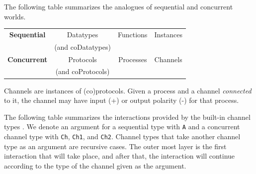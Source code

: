 \documentclass[acmsmall]{acmart}
\begin{document}
The following table summarizes the analogues of sequential and concurrent worlds.

\begin{center}
\begin{tabular}{ c | c | c | c }
 {\bf Sequential} & Datatypes  & Functions & Instances \\ 
   & (and coDatatypes)  &  &  \\
 \hline
 {\bf Concurrent} & Protocols & Processes & Channels \\  
 & (and coProtocols)  &  &  \\
\end{tabular}
\end{center}

Channels are instances of (co)protocols. Given a process and a channel {\em connected} to it, the channel may have input (+) or output polarity (-) for that process. 

The following table summarizes the interactions provided by the built-in channel types \cite[Section 3.3.2]{Ku18}.
We denote an argument for a sequential type with \lstinline$A$ and a concurrent channel type with \lstinline$Ch$, \lstinline$Ch1$, and \lstinline$Ch2$.
Channel types that take another channel type as an argument are recursive cases.
The outer most layer is the first interaction that will take place, and after that, the interaction will continue according to the type of the channel given as the argument.
\end{document}
